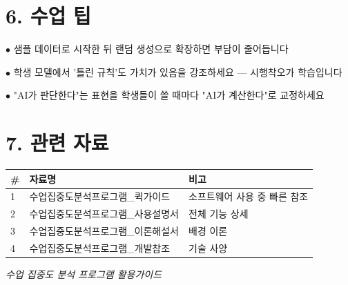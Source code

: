 \documentclass[11pt,a4paper]{article}
\begin{document}
\section*{6. 수업 팁}

$\bullet$  샘플 데이터로 시작한 뒤 랜덤 생성으로 확장하면 부담이 줄어듭니다

$\bullet$  학생 모델에서 '틀린 규칙'도 가치가 있음을 강조하세요 — 시행착오가 학습입니다

$\bullet$  "AI가 판단한다"는 표현을 학생들이 쓸 때마다 "AI가 계산한다"로 교정하세요



\section*{7. 관련 자료}

\begin{center}
\renewcommand{\arraystretch}{1.4}
\begin{tabular}{|p{1.5cm}|p{6.9cm}|p{6.6cm}|}
\hline
\rowcolor{tableheader}
\textbf{\#} & \textbf{자료명} & \textbf{비고} \\
\hline
1 & 수업집중도분석프로그램\_퀵가이드 & 소프트웨어 사용 중 빠른 참조 \\
\hline
2 & 수업집중도분석프로그램\_사용설명서 & 전체 기능 상세 \\
\hline
3 & 수업집중도분석프로그램\_이론해설서 & 배경 이론 \\
\hline
4 & 수업집중도분석프로그램\_개발참조 & 기술 사양 \\
\hline
\end{tabular}
\end{center}


\vfill
\begin{center}
\small\color{lightbrown}
\textit{수업 집중도 분석 프로그램 활용가이드}
\end{center}
\end{document}
